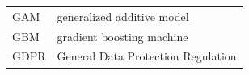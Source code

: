 \documentclass[information,article,accept,moreauthors,pdftex]{Definitions/mdpi}
\begin{document}
{\begin{tabular}{@{}ll}
GAM & generalized additive model\\ %
GBM & gradient boosting machine\\ %
GDPR & General Data Protection Regulation\\%
\end{tabular}


}
\end{document}
